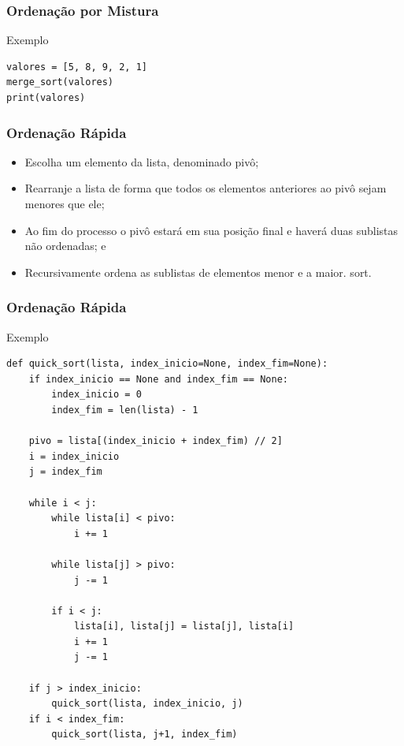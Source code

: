 \documentclass{beamer}
\begin{document}
\begin{frame}[fragile]
\frametitle{Ordenação por Mistura}

\begin{exampleblock}{Exemplo}
	\begin{lstlisting}
valores = [5, 8, 9, 2, 1]
merge_sort(valores)
print(valores)
	\end{lstlisting}
\end{exampleblock}
\end{frame}

\begin{frame}
\frametitle{Ordenação Rápida}

\begin{itemize}
	\item Escolha um elemento da lista, denominado pivô;
	\item Rearranje a lista de forma que todos os elementos anteriores ao pivô
	sejam menores que ele;
	\item Ao fim do processo o pivô estará em sua posição final e haverá duas
	sublistas não ordenadas; e
	\item Recursivamente ordena as sublistas de elementos menor e a maior.
	sort.
\end{itemize}
\end{frame}

\begin{frame}[fragile]
\frametitle{Ordenação Rápida}

\begin{exampleblock}{Exemplo}
	\begin{lstlisting}
def quick_sort(lista, index_inicio=None, index_fim=None):
    if index_inicio == None and index_fim == None:
        index_inicio = 0
        index_fim = len(lista) - 1

    pivo = lista[(index_inicio + index_fim) // 2]
    i = index_inicio
    j = index_fim

    while i < j:
        while lista[i] < pivo:
            i += 1

        while lista[j] > pivo:
            j -= 1

        if i < j:    
            lista[i], lista[j] = lista[j], lista[i]
            i += 1
            j -= 1

    if j > index_inicio:
        quick_sort(lista, index_inicio, j)
    if i < index_fim:
        quick_sort(lista, j+1, index_fim)
	\end{lstlisting}
\end{exampleblock}
\end{frame}
\end{document}
